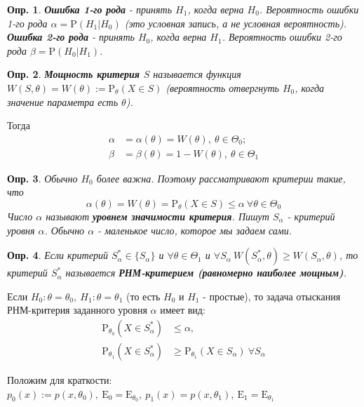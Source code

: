 \documentclass[12pt]{article}
\newtheorem{definition}{Опр.}
\theoremstyle{basic_theorem}
\theoremstyle{name_theorem}
\newcommand\defin[1]{\textbf{#1}}
\def\E{
    \mathrm{E}
}
\def\P{
    \mathrm{P}
}
\begin{document}
\begin{definition}  
    \defin{Ошибка 1-го рода} - принять $H_1$, когда
    верна $H_0$. Вероятность ошибки 1-го рода $\alpha
    = \P(H_1 | H_0)$ (это условная запись, а не условная вероятность). 
    \defin{Ошибка 2-го рода} - принять $H_0$, когда
    верна $H_1$. Вероятность ошибки 2-го рода $\beta
    = \P(H_0 | H_1)$.
\end{definition}

\begin{definition}
    \defin{Мощность критерия $S$} называется функция $W(S, \theta) = W(\theta)
    := \P_\theta(X\in S)$ (вероятность отвергнуть $H_0$, когда
    значение параметра есть $\theta$).
\end{definition}

Тогда
\begin{align*}
    \alpha &= \alpha(\theta) = W(\theta),\ \theta\in\Theta_0; \\
    \beta  &= \beta(\theta) = 1 - W(\theta),\ \theta\in\Theta_1
\end{align*}

\begin{definition}
Обычно $H_0$ более важна. Поэтому рассматривают критерии
такие, что 
$$\alpha(\theta) = W(\theta) = \P_{\theta}(X\in S) \leq\alpha \ \forall \theta\in\Theta_0$$
    Число $\alpha$ называют \defin{уровнем значимости критерия}.
    Пишут $S_\alpha$ - критерий уровня $\alpha$. Обычно $\alpha$ -
    маленькое число, которое мы задаем сами.
\end{definition}

\begin{definition}
    Если критерий $S^*_\alpha \in \{S_\alpha\}$ и $\forall\theta\in\Theta_1$ и
    $\forall S_\alpha \ W(S^*_\alpha,\theta) \geq W(S_\alpha, \theta)$,
    то критерий $S^*_\alpha$ называется \defin{РНМ-критерием (равномерно наиболее мощным)}.
\end{definition}

Если $H_0:\theta = \theta_0,\ H_1:\theta = \theta_1$ (то есть
$H_0$ и $H_1$ - простые), то задача отыскания РНМ-критерия
заданного уровня $\alpha$ имеет вид:
\begin{align*}
  \P_{\theta_0}(X\in S^*_\alpha) &\leq \alpha, \\
  \P_{\theta_1}(X\in S^*_\alpha) &\geq \P_{\theta_1}(X\in S_\alpha) \ \forall S_\alpha
\end{align*}

Положим для краткости:
$p_0(x) := p(x, \theta_0),\ \E_0 = \E_{\theta_0},\ p_{1}(x) = p(x, \theta_1),\ \E_1 = \E_{\theta_1}$
\end{document}
